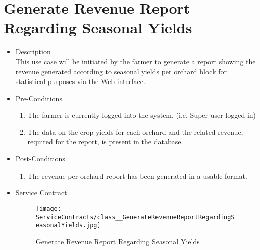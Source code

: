 \documentclass[11pt,fleqn]{book} %
\begin{document}
\section{Generate Revenue Report Regarding Seasonal Yields}
\begin{itemize}
	\item Description\\
	This use case will be initiated by the farmer to generate a report showing the revenue generated according to seasonal yields per orchard block for statistical purposes via the Web interface.
	\item Pre-Conditions
	\begin{enumerate}
		\item The farmer is currently logged into the system. (i.e. Super user logged in)
		\item The data on the crop yields for each orchard and the related revenue, required for the report, is present in the database.	
	\end{enumerate}
	\item Post-Conditions
	\begin{enumerate}
		\item The revenue per orchard report has been generated in a usable format.
	\end{enumerate}
	\item Service Contract
	\begin{figure}
		\texttt{[image: ServiceContracts/class\_\_GenerateRevenueReportRegardingSeasonalYields.jpg]}
		\caption{Generate Revenue Report Regarding Seasonal Yields}
	\end{figure}
\end{itemize}
\end{document}
